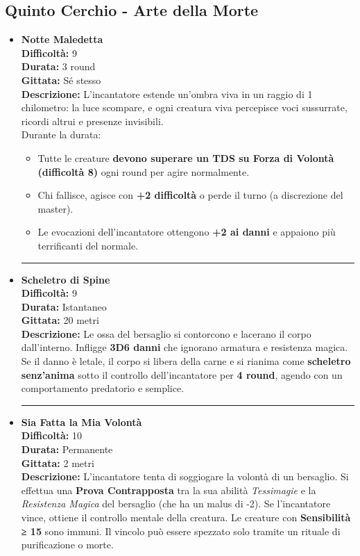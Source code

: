 \documentclass[./magie.tex]{subfiles}
\begin{document}
\clearpage
\subsection*{Quinto Cerchio - Arte della Morte}

\begin{itemize}
\item \textbf{Notte Maledetta} \\
\textbf{Difficoltà:} 9 \\
\textbf{Durata:} 3 round \\
\textbf{Gittata:} Sé stesso \\
\textbf{Descrizione:} L’incantatore estende un’ombra viva in un raggio di 1 chilometro: la luce scompare, e ogni creatura viva percepisce voci sussurrate, ricordi altrui e presenze invisibili.\\
Durante la durata:
\begin{itemize}
\item Tutte le creature \textbf{devono superare un TDS su Forza di Volontà (difficoltà 8)} ogni round per agire normalmente.
\item Chi fallisce, agisce con \textbf{+2 difficoltà} o perde il turno (a discrezione del master).
\item Le evocazioni dell’incantatore ottengono \textbf{+2 ai danni} e appaiono più terrificanti del normale.
\end{itemize}

\vspace{0.5cm}\rule{\textwidth}{0.4pt}\vspace{1cm}

\item \textbf{Scheletro di Spine} \\
\textbf{Difficoltà:} 9 \\
\textbf{Durata:} Istantaneo \\
\textbf{Gittata:} 20 metri \\
\textbf{Descrizione:} Le ossa del bersaglio si contorcono e lacerano il corpo dall’interno. Infligge \textbf{3D6 danni} che ignorano armatura e resistenza magica. Se il danno è letale, il corpo si libera della carne e si rianima come \textbf{scheletro senz’anima} sotto il controllo dell’incantatore per \textbf{4 round}, agendo con un comportamento predatorio e semplice.


\vspace{0.5cm}\rule{\textwidth}{0.4pt}\vspace{1cm}
\clearpage
\item \textbf{Sia Fatta la Mia Volontà} \\
\textbf{Difficoltà:} 10 \\
\textbf{Durata:} Permanente \\
\textbf{Gittata:} 2 metri \\
\textbf{Descrizione:} L’incantatore tenta di soggiogare la volontà di un bersaglio. Si effettua una \textbf{Prova Contrapposta} tra la sua abilità \emph{Tessimagie} e la \emph{Resistenza Magica} del bersaglio (che ha un malus di -2). Se l’incantatore vince, ottiene il controllo mentale della creatura. Le creature con \textbf{Sensibilità ≥ 15} sono immuni. Il vincolo può essere spezzato solo tramite un rituale di purificazione o morte.


\end{itemize}
\end{document}
